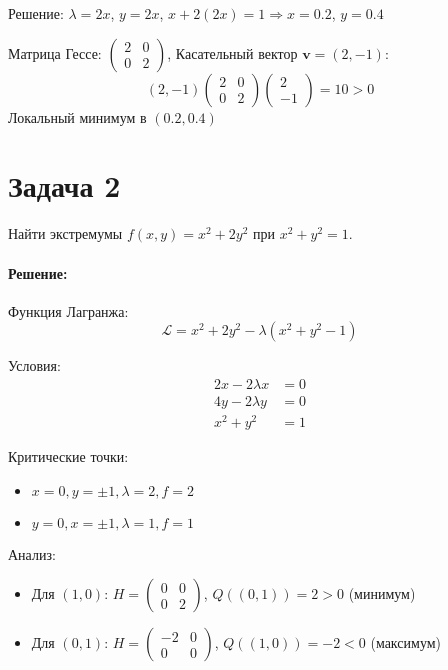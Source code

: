 \documentclass{article}
\begin{document}
Решение: $\lambda = 2x$, $y = 2x$, $x + 2(2x) = 1 \Rightarrow x = 0.2$, $y = 0.4$

Матрица Гессе:
$\begin{pmatrix} 2 & 0 \\ 0 & 2 \end{pmatrix}$, 
Касательный вектор $\mathbf{v} = (2, -1)$:
\[
(2,-1)\begin{pmatrix} 2 & 0 \\ 0 & 2 \end{pmatrix}\begin{pmatrix} 2 \\ -1 \end{pmatrix} = 10 > 0
\]
Локальный минимум в $(0.2, 0.4)$

\section*{Задача 2}
Найти экстремумы $f(x,y) = x^2 + 2y^2$ при $x^2 + y^2 = 1$.

\paragraph*{Решение:}
Функция Лагранжа:
\[
\mathcal{L} = x^2 + 2y^2 - \lambda(x^2 + y^2 - 1)
\]

Условия:
\begin{align*}
2x - 2\lambda x &= 0 \\
4y - 2\lambda y &= 0 \\
x^2 + y^2 &= 1
\end{align*}

Критические точки:
\begin{itemize}
\item $x=0, y=\pm1, \lambda=2, f=2$
\item $y=0, x=\pm1, \lambda=1, f=1$
\end{itemize}

Анализ:
\begin{itemize}
\item Для $(1,0)$: $H = \begin{pmatrix} 0 & 0 \\ 0 & 2 \end{pmatrix}$, $Q((0,1)) = 2 > 0$ (минимум)
\item Для $(0,1)$: $H = \begin{pmatrix} -2 & 0 \\ 0 & 0 \end{pmatrix}$, $Q((1,0)) = -2 < 0$ (максимум)
\end{itemize}
\end{document}
